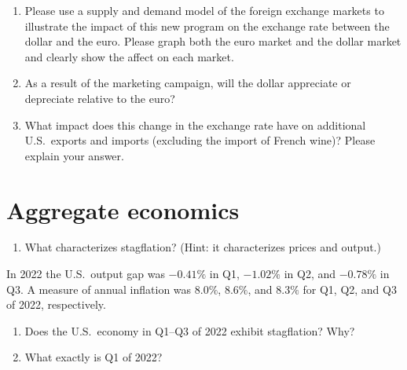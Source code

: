 \documentclass{assignment}
\begin{document}
\begin{enumerate}[resume]

\item Please use a supply and demand model of the foreign exchange markets to illustrate the impact of this new program on the exchange rate between the dollar and the euro. Please graph both the euro market and the dollar market and clearly show the affect on each market.

\vfill

\item As a result of the marketing campaign, will the dollar appreciate or depreciate relative to the euro?

\vspace{2.0\baselineskip}

\item What impact does this change in the exchange rate have on additional U.S.~exports and imports (excluding the import of French wine)? Please explain your answer.

\vspace{6.0\baselineskip}

\end{enumerate}

\clearpage

\section{Aggregate economics}

\begin{enumerate}

\item What characterizes stagflation? (Hint: it characterizes prices and output.)

\vfill

\end{enumerate}

In 2022 the U.S.~output gap was $-0.41\%$ in Q1, $-1.02\%$ in Q2, and $-0.78\%$ in Q3. A measure of annual inflation was $8.0\%$, $8.6\%$, and $8.3\%$ for Q1, Q2, and Q3 of 2022, respectively.

\begin{enumerate}[resume]

\item Does the U.S.~economy in Q1--Q3 of 2022 exhibit stagflation? Why?

\vfill

\item What exactly is Q1 of 2022?

\vfill

\end{enumerate}
\end{document}
